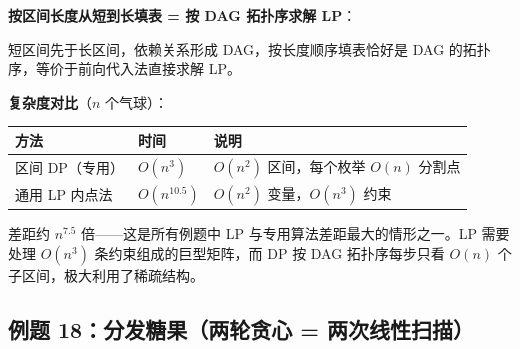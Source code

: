 \documentclass[12pt, a4paper]{ctexart}
\begin{document}
\begin{blackboard}
\textbf{按区间长度从短到长填表 = 按 DAG 拓扑序求解 LP}：

短区间先于长区间，依赖关系形成 DAG，按长度顺序填表恰好是 DAG 的拓扑序，等价于前向代入法直接求解 LP。

\textbf{复杂度对比}（$n$ 个气球）：

\begin{center}
\begin{tabular}{lll}
\toprule
方法 & 时间 & 说明 \\
\midrule
区间 DP（专用） & $O(n^3)$ & $O(n^2)$ 区间，每个枚举 $O(n)$ 分割点 \\
通用 LP 内点法 & $O(n^{10.5})$ & $O(n^2)$ 变量，$O(n^3)$ 约束 \\
\bottomrule
\end{tabular}
\end{center}

差距约 $n^{7.5}$ 倍——这是所有例题中 LP 与专用算法差距最大的情形之一。LP 需要处理 $O(n^3)$ 条约束组成的巨型矩阵，而 DP 按 DAG 拓扑序每步只看 $O(n)$ 个子区间，极大利用了稀疏结构。

\end{blackboard}

\subsection{例题 18：分发糖果（两轮贪心 = 两次线性扫描）}
\end{document}
